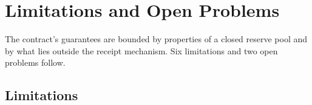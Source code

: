 \documentclass[../main.tex]{subfiles}
\begin{document}
%
%
%

\section{Limitations and Open Problems}
\label{sec:attestation:limitations}

The contract's guarantees are bounded by properties of a closed reserve pool and by what lies
outside the receipt mechanism. Six limitations and two open problems follow.

\subsection{Limitations}
\label{sec:limitations:limitations}
\end{document}
